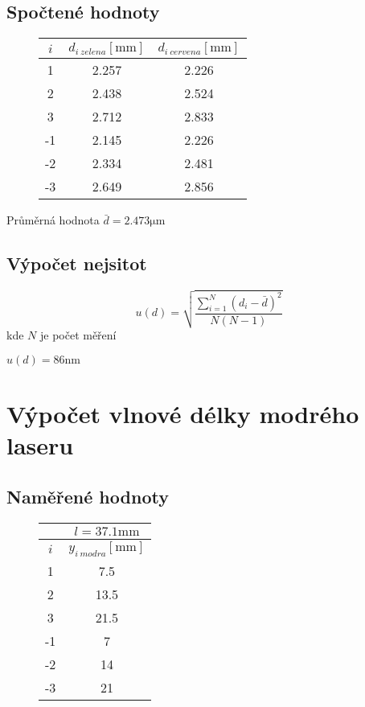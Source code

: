 \documentclass[a4paper,10pt]{article}
\begin{document}
\subsection{Spočtené hodnoty}

\begin{figure}[H]
	\centering
    \begin{tabular}{c||c|c}
        $i$ & $d_{i\ zelena} [\si{\milli\meter}]$ & $d_{i\ cervena} [\si{\milli\meter}]$\\ \hline \hline
        1 & 2.257 & 2.226 \\ \hline
        2 & 2.438 & 2.524 \\ \hline
        3 & 2.712 & 2.833 \\ \hline
        -1 & 2.145 & 2.226 \\ \hline
        -2 & 2.334 & 2.481 \\ \hline
        -3 & 2.649 & 2.856
    \end{tabular}
\end{figure}

Průměrná hodnota $\bar{d} = 2.473 \si{\micro\meter}$

\subsection{Výpočet nejsitot}

\begin{equation}
 u(d) = \sqrt{\frac{\sum_{i=1}^N(d_i-\bar{d})^2}{N(N-1)}}
\end{equation}
kde $N$ je počet měření

$u(d) = 86 \si{\nano\meter}$

\section{Výpočet vlnové délky modrého laseru}

\subsection{Naměřené hodnoty}

\begin{figure}[H]
	\centering
    \begin{tabular}{c||c}
        & $l=37.1 \si{\milli\meter}$\\ \hline
        $i$ & $y_{i\ modra} [\si{\milli\meter}]$\\ \hline \hline
        1 & 7.5 \\ \hline
        2 & 13.5 \\ \hline
        3 & 21.5 \\ \hline
        -1 & 7 \\ \hline
        -2 & 14 \\ \hline
        -3 & 21
    \end{tabular}
\end{figure}
\end{document}
